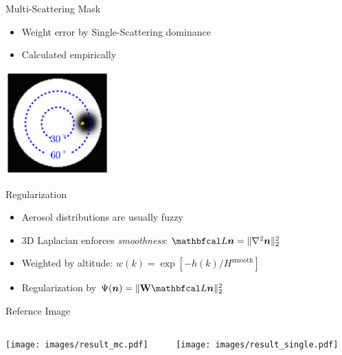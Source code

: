\documentclass[compress,red,12pt]{beamer}
\begin{document}
\begin{frame}[label=mask]{Multi-Scattering Mask}
  \begin{itemize}
  \item Weight error by Single-Scattering dominance
  \item Calculated empirically
  \end{itemize}
  \centerline{\includegraphics[height=4cm]{images/sun_mask.pdf}}
  \hfill\hyperlink{objective<6>}{} 
\end{frame}


\begin{frame}[label=regularization]{Regularization}
  \begin{itemize}
  \item Aerosol distributions are usually fuzzy
  \item 3D Laplacian enforces {\em smoothness}: $\Laplacian{\bm n} = \| \nabla^2{\bm  n}\|^2_2$
  \item Weighted by altitude: $w(k)=\exp\left[-h(k)/H^\mathrm{smooth}\right]$
  \item Regularization by $\Psi({\bm n}) = \| {\bf W} \Laplacian{\bm n}\|^2_2$
  \end{itemize}

  \hfill\hyperlink{objective<5>}{}
\end{frame}


\begin{frame}[label=ref-images]{Refernce Image}
  \begin{columns}[T]
    \begin{column}{.5\textwidth}
      \centering
        \texttt{[image: images/result\_mc.pdf]}
    \end{column}
    \begin{column}{.5\textwidth}
      \centering
        \texttt{[image: images/result\_single.pdf]}
    \end{column}
  \end{columns}

  \hfill\hyperlink{objective<2>}{}
\end{frame}
\end{document}

